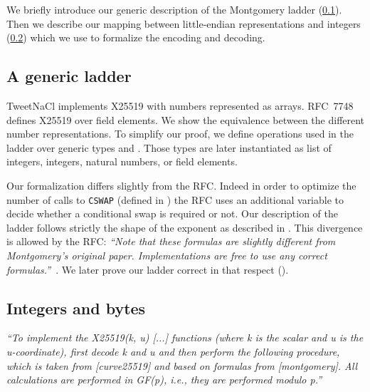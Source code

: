 We briefly introduce our generic description of the Montgomery ladder (\ref{subsec:spec-ladder}).
Then we describe our mapping between little-endian representations and integers
(\ref{subsec:integer-bytes}) which we use to formalize the encoding and decoding.



\subsection{A generic ladder}
\label{subsec:spec-ladder}



TweetNaCl implements X25519 with numbers represented as arrays.
RFC~7748 defines X25519 over field elements. We show the equivalence between
the different number representations. To simplify our proof, we define operations
used in the ladder over generic types  and .
Those types are later instantiated as list of integers, integers, natural
numbers, or field elements.



Our formalization differs slightly from the RFC. Indeed in order to optimize the
number of calls to \texttt{CSWAP} (defined in )
the RFC uses an additional variable to decide
whether a conditional swap is required or not. Our description of the ladder
follows strictly the shape of the exponent as described in .
This divergence is allowed by the RFC:
\emph{``Note that these formulas are slightly different from Montgomery's
original paper. Implementations are free to use any correct formulas.''}~\cite{rfc7748}.
We later prove our ladder correct in that respect ().




\subsection{Integers and bytes}
\label{subsec:integer-bytes}

\emph{``To implement the X25519(k, u) [...] functions (where k is
the scalar and u is the u-coordinate), first decode k and u and then
perform the following procedure, which is taken from [curve25519] and
based on formulas from [montgomery].  All calculations are performed
in GF(p), i.e., they are performed modulo p.''}~\cite{rfc7748}

